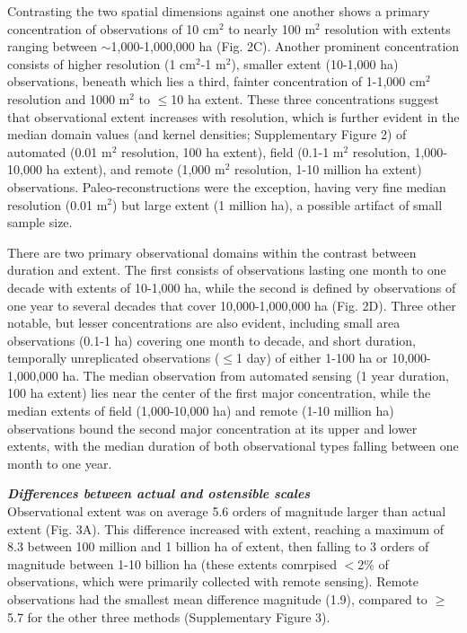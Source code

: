 \documentclass[12pt]{article}
\begin{document}
Contrasting the two spatial dimensions against one another shows a primary concentration of observations of 10 cm$^2$ to nearly 100 m$^2$ resolution with extents ranging between $\sim$1,000-1,000,000 ha (Fig. 2C). Another prominent concentration consists of higher resolution (1 cm$^2$-1 m$^2$), smaller extent (10-1,000 ha) observations, beneath which lies a third, fainter concentration of 1-1,000 cm$^2$ resolution and 1000 m$^2$ to $\leq$10 ha extent. These three concentrations suggest that observational extent increases with resolution, which is further evident in the median domain values (and kernel densities; Supplementary Figure 2) of automated (0.01 m$^2$ resolution, 100 ha extent), field (0.1-1 m$^2$ resolution, 1,000-10,000 ha extent), and remote (1,000 m$^2$ resolution, 1-10 million ha extent) observations.  Paleo-reconstructions were the exception, having very fine median resolution (0.01 m$^2$) but large extent (1 million ha), a possible artifact of small sample size. 

There are two primary observational domains within the contrast between duration and extent. The first consists of observations lasting one month to one decade with extents of 10-1,000 ha, while the second is defined by observations of one year to several decades that cover 10,000-1,000,000 ha (Fig. 2D).  Three other notable, but lesser concentrations are also evident, including small area observations (0.1-1 ha) covering one month to decade, and short duration, temporally unreplicated observations ($\leq$1 day) of either 1-100 ha or 10,000-1,000,000 ha.  The median observation from automated sensing (1 year duration, 100 ha extent) lies near the center of the first major concentration, while the median extents of field (1,000-10,000 ha) and remote (1-10 million ha) observations bound the second major concentration at its upper and lower extents, with the median duration of both observational types falling between one month to one year. 

\vspace{5pt}
\noindent \textbf{\emph{Differences between actual and ostensible scales}}\\
Observational extent was on average 5.6 orders of magnitude larger than actual extent (Fig. 3A). This difference increased with extent, reaching a maximum of 8.3 between 100 million and 1 billion ha of extent, then falling to 3 orders of magnitude between 1-10 billion ha (these extents comrpised $<$2\% of observations, which were primarily collected with remote sensing). Remote observations had the smallest mean difference magnitude (1.9), compared to $\geq$5.7 for the other three methods (Supplementary Figure 3). 
\end{document}
